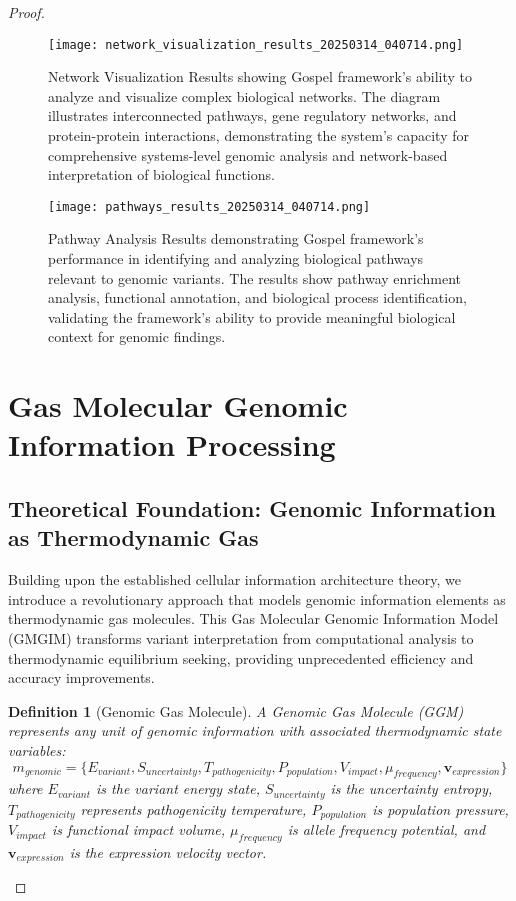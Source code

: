\documentclass[12pt,a4paper]{article}
\newtheorem{definition}[theorem]{Definition}
\begin{document}
\begin{proof}
\begin{figure}[H]
\centering
\texttt{[image: network\_visualization\_results\_20250314\_040714.png]}
\caption{Network Visualization Results showing Gospel framework's ability to analyze and visualize complex biological networks. The diagram illustrates interconnected pathways, gene regulatory networks, and protein-protein interactions, demonstrating the system's capacity for comprehensive systems-level genomic analysis and network-based interpretation of biological functions.}
\label{fig:network-visualization}
\end{figure}

\begin{figure}[H]
\centering
\texttt{[image: pathways\_results\_20250314\_040714.png]}
\caption{Pathway Analysis Results demonstrating Gospel framework's performance in identifying and analyzing biological pathways relevant to genomic variants. The results show pathway enrichment analysis, functional annotation, and biological process identification, validating the framework's ability to provide meaningful biological context for genomic findings.}
\label{fig:pathways-results}
\end{figure}

\section{Gas Molecular Genomic Information Processing}

\subsection{Theoretical Foundation: Genomic Information as Thermodynamic Gas}

Building upon the established cellular information architecture theory, we introduce a revolutionary approach that models genomic information elements as thermodynamic gas molecules. This Gas Molecular Genomic Information Model (GMGIM) transforms variant interpretation from computational analysis to thermodynamic equilibrium seeking, providing unprecedented efficiency and accuracy improvements.

\begin{definition}[Genomic Gas Molecule]
A Genomic Gas Molecule (GGM) represents any unit of genomic information with associated thermodynamic state variables:
$$m_{genomic} = \{E_{variant}, S_{uncertainty}, T_{pathogenicity}, P_{population}, V_{impact}, \mu_{frequency}, \mathbf{v}_{expression}\}$$
where $E_{variant}$ is the variant energy state, $S_{uncertainty}$ is the uncertainty entropy, $T_{pathogenicity}$ represents pathogenicity temperature, $P_{population}$ is population pressure, $V_{impact}$ is functional impact volume, $\mu_{frequency}$ is allele frequency potential, and $\mathbf{v}_{expression}$ is the expression velocity vector.
\end{definition}


\end{proof}
\end{document}
